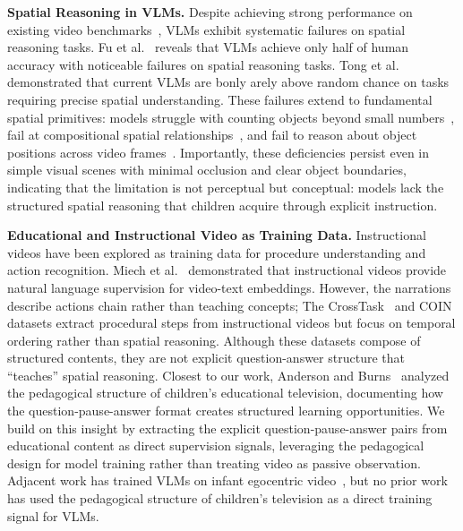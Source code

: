 \documentclass{article}
\begin{document}
\textbf{Spatial Reasoning in VLMs.}
Despite achieving strong performance on existing video benchmarks~\cite{xiao2021next, xu2017videoquestion}, VLMs exhibit systematic failures on spatial reasoning tasks. Fu et al.~\cite{fu2024blink} reveals that VLMs achieve only half of human accuracy with noticeable failures on spatial reasoning tasks. Tong et al.~\cite{tong2024eyes} demonstrated that current VLMs are bonly arely above random chance on tasks requiring precise spatial understanding. These failures extend to fundamental spatial primitives: models struggle with counting objects beyond small numbers~\cite{paiss2023teaching}, fail at compositional spatial relationships~\cite{thrush2022winoground}, and fail to reason about object positions across video frames~\cite{li2024tomato}. Importantly, these deficiencies persist even in simple visual scenes with minimal occlusion and clear object boundaries, indicating that the limitation is not perceptual but conceptual: models lack the structured spatial reasoning that children acquire through explicit instruction.

\textbf{Educational and Instructional Video as Training Data.}
Instructional videos have been explored as training data for procedure understanding and action recognition. Miech et al.~\cite{miech2019howto100m} demonstrated that instructional videos provide natural language supervision for video-text embeddings. However, the narrations describe actions chain rather than teaching concepts; The CrossTask~\cite{zhukov2019crosstask} and COIN~\cite{tang2019coin} datasets extract procedural steps from instructional videos but focus on temporal ordering rather than spatial reasoning. Although these datasets compose of structured contents, they are not explicit question-answer structure that ``teaches'' spatial reasoning. Closest to our work, Anderson and Burns~\cite{anderson2000blueclues} analyzed the pedagogical structure of children's educational television, documenting how the question-pause-answer format creates structured learning opportunities. We build on this insight by extracting the explicit question-pause-answer pairs from educational content as direct supervision signals, leveraging the pedagogical design for model training rather than treating video as passive observation. Adjacent work has trained VLMs on infant egocentric video~\cite{wang2025babyvlm}, but no prior work has used the pedagogical structure of children's television as a direct training signal for VLMs.
\doravqapipeline
\end{document}
